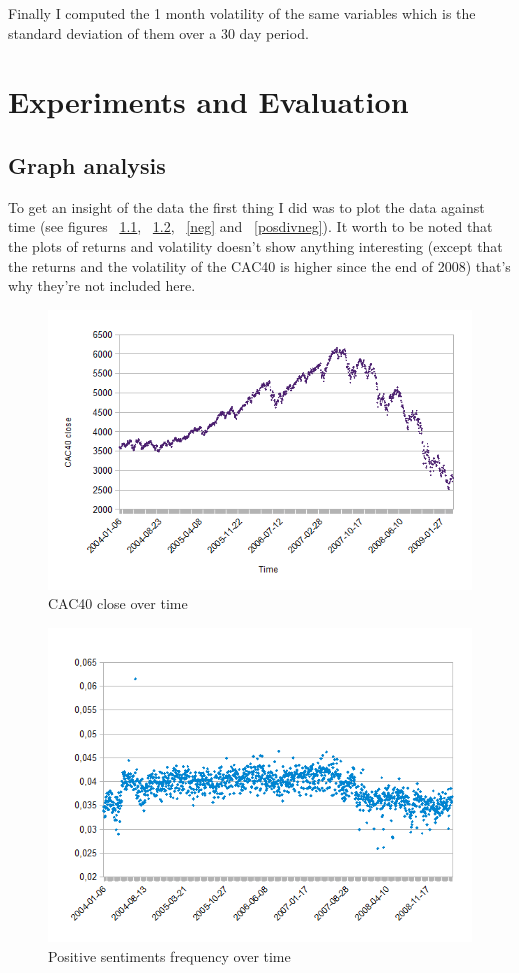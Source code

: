 \documentclass[12pt]{report}
\begin{document}
			Finally I computed the 1 month volatility of the same variables which is the standard deviation of them over a 30 day period.
			
	\chapter{Experiments and Evaluation}
		\section{Graph analysis}
		
			To get an insight of the data the first thing I did was to plot the data against time (see figures ~\ref{cac}, ~\ref{pos}, ~\ref{neg} and ~\ref{posdivneg}). It worth to be noted that the plots of returns and volatility doesn't show anything interesting (except that the returns and the volatility of the CAC40 is higher since the end of 2008) that's why they're not included here.

			\begin{figure}[h]
				\caption{CAC40 close over time\label{cac}}
				\includegraphics{plots/cac.png}
			\end{figure}

			\begin{figure}[h]
				\caption{Positive sentiments frequency over time\label{pos}}
				\includegraphics{plots/pos.png}
			\end{figure}
	
\end{document}
